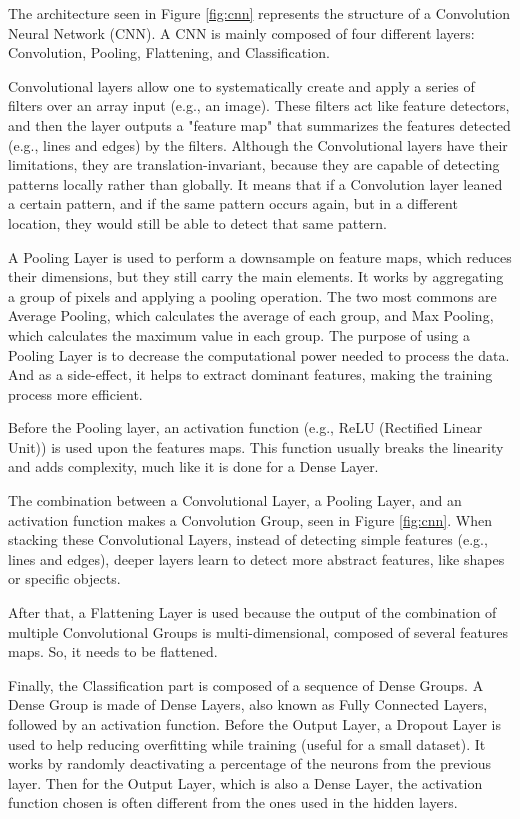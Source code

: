 \documentclass[../main.tex]{subfile}
\begin{document}
    The architecture seen in Figure \ref{fig:cnn} represents the structure of a Convolution Neural Network (CNN). A CNN is mainly composed of four different layers: Convolution, Pooling, Flattening, and Classification.
    
    Convolutional layers allow one to systematically create and apply a series of filters over an array input (e.g., an image). These filters act like feature detectors, and then the layer outputs a "feature map" that summarizes the features detected (e.g., lines and edges) by the filters. Although the Convolutional layers have their limitations, they are translation-invariant, because they are capable of detecting patterns locally rather than globally. It means that if a Convolution layer leaned a certain pattern, and if the same pattern occurs again, but in a different location, they would still be able to detect that same pattern.

    A Pooling Layer is used to perform a downsample on feature maps, which reduces their dimensions, but they still carry the main elements. It works by aggregating a group of pixels and applying a pooling operation. The two most commons are Average Pooling, which calculates the average of each group, and Max Pooling, which calculates the maximum value in each group. The purpose of using a Pooling Layer is to decrease the computational power needed to process the data. And as a side-effect, it helps to extract dominant features, making the training process more efficient.

    Before the Pooling layer, an activation function (e.g., ReLU (Rectified Linear Unit)) is used upon the features maps. This function usually breaks the linearity and adds complexity, much like it is done for a Dense Layer.
    
    The combination between a Convolutional Layer, a Pooling Layer, and an activation function makes a Convolution Group, seen in Figure \ref{fig:cnn}. When stacking these Convolutional Layers, instead of detecting simple features (e.g., lines and edges), deeper layers learn to detect more abstract features, like shapes or specific objects.
    
    After that, a Flattening Layer is used because the output of the combination of multiple Convolutional Groups is multi-dimensional, composed of several features maps. So, it needs to be flattened.
    
    Finally, the Classification part is composed of a sequence of Dense Groups. A Dense Group is made of Dense Layers, also known as Fully Connected Layers, followed by an activation function. Before the Output Layer, a Dropout Layer is used to help reducing overfitting while training (useful for a small dataset). It works by randomly deactivating a percentage of the neurons from the previous layer. Then for the Output Layer, which is also a Dense Layer, the activation function chosen is often different from the ones used in the hidden layers.
    
\end{document}
